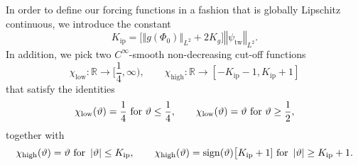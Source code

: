 \documentclass[10pt]{articleHJ}
\newcommand{\Real}{\mathbb{R}}							%
\newcommand{\abs}[1]{\left\vert#1\right\vert}			%
\newcommand{\norm}[1]{\left\Vert#1\right\Vert}		%
\numberwithin{equation}{section}
\begin{document}
In order to define our forcing functions in a fashion
that is globally Lipschitz continuous,
we introduce
the constant
\begin{equation}
\label{eq:mr:def:k:ip}
K_{\mathrm{ip}} = \big[\norm{g(\Phi_{0})}_{L^2} + 2 K_g \big] \norm{\psi_{\mathrm{tw}}}_{L^2}.
\end{equation}
In addition, we pick
two $C^\infty$-smooth non-decreasing cut-off functions
\begin{equation}
\chi_{\mathrm{low}}: \Real \to [\frac{1}{4}, \infty),
\qquad
\chi_{\mathrm{high}}: \Real \to
[- K_{\mathrm{ip}} - 1, K_{\mathrm{ip}} + 1]
\end{equation}
that satisfy the identities
\begin{equation}
\chi_{\mathrm{low}}(\vartheta) = \frac{1}{4} \hbox{ for } \vartheta \le \frac{1}{4},
\qquad
\chi_{\mathrm{low}}(\vartheta) = \vartheta \hbox{ for } \vartheta \ge \frac{1}{2},
\end{equation}
together with
\begin{equation}
\chi_{\mathrm{high}}(\vartheta) = \vartheta \hbox{ for } \abs{\vartheta} \le K_{\mathrm{ip}},
\qquad
\chi_{\mathrm{high}}(\vartheta) = \mathrm{sign}(\vartheta) \big[K_{\mathrm{ip}} + 1]
   \hbox{ for } \abs{\vartheta} \ge K_{\mathrm{ip}} + 1.
\end{equation}
\end{document}
